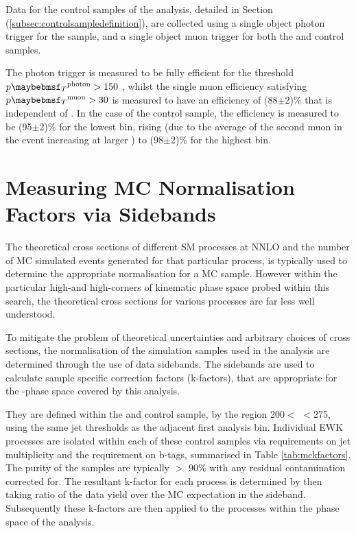 Data for the control samples of the analysis, detailed in Section (\ref{subsec:controlsampledefinition}), are collected using a single object photon trigger for the \gpjets sample, and a single object muon trigger for both the \mupjets and \dimupjets control samples. 

The photon trigger is measured to be fully efficient for the threshold $\pt^{\text{photon}} > 150$ \GeV, whilst the single muon efficiency satisfying $\pt^{\text{muon}} > 30$ \GeV is measured to have an efficiency of (88$\pm$2)\% that is independent of \theht. In the case of the \dimupjets control sample, the efficiency is measured to be (95$\pm$2)\% for the lowest \theht bin, rising (due to the average \pt of the second muon in the event increasing at larger \theht)
to (98$\pm$2)\% for the highest \theht bin. 

\section{Measuring MC Normalisation Factors via \theht Sidebands}
\label{subsec:mckfactors}

The theoretical cross sections of different \ac{SM} processes at \acf{NNLO} and the number of MC simulated events generated for that particular process, is typically used to determine the appropriate normalisation for a MC sample. However within the particular high-\theht and high-\met corners of kinematic phase space probed within this search, the theoretical cross sections for various processes are far less well understood. 

To mitigate the problem of theoretical uncertainties and arbitrary choices of cross sections, the normalisation of the simulation samples used in the analysis are determined through the use of data sidebands. The sidebands are used to calculate sample specific correction factors (k-factors), that are appropriate for the \theht-\met phase space covered by this analysis. 

They are defined within the \mupjets and \dimupjets control sample, by the region 200$<$ \theht$<$275, using the same jet \pt thresholds as the adjacent first analysis bin. Individual \ac{EWK} processes are isolated within each of these control samples via requirements on jet multiplicity and the requirement on b-tags, summarised in Table \ref{tab:mckfactors}. The purity of the samples are typically $>$ 90\% with any residual contamination corrected for. The resultant k-factor for each process is determined by then taking ratio of the data yield over the MC expectation in the sideband. Subsequently these k-factors are then applied to the processes within the phase space of the analysis.

